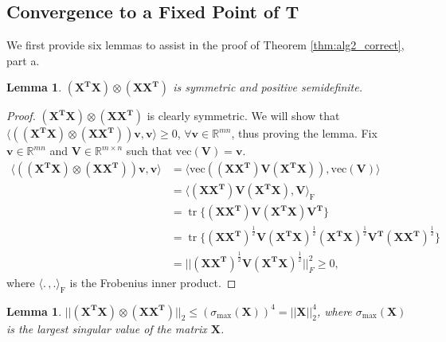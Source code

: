 \documentclass[12pt]{article}
\newtheorem{lemma}[theorem]{Lemma}
\DeclareMathOperator{\tr}{tr}
\begin{document}
\subsection{Convergence to a Fixed Point of $\mathbf{T}$} 

We first provide six lemmas to assist in the proof of Theorem \ref{thm:alg2_correct}, part a.

\begin{lemma}
\label{lemma:psd}
    $\mathbf{(X^TX) \otimes (XX^T)}$ is symmetric and positive semidefinite. 
\end{lemma}
\begin{proof}
    $\mathbf{(X^TX) \otimes (XX^T)}$ is clearly symmetric. We will show that $\langle (\mathbf{(X^TX) \otimes (XX^T)})\mathbf{v}, \mathbf{v} \rangle \geq 0$, $\forall \mathbf{v} \in \mathbb{R}^{mn}$, thus proving the lemma. Fix $\mathbf{v} \in \mathbb{R}^{mn}$ and $\mathbf{V} \in \mathbb{R}^{m \times n}$ such that $\text{vec}(\mathbf{V}) = \mathbf{v}$.
    \begin{equation*}
        \begin{split}
            \langle (\mathbf{(X^TX) \otimes (XX^T)})\mathbf{v}, \mathbf{v} \rangle & = \langle \text{vec}(\mathbf{(XX^T)V(X^TX)}), \text{vec}(\mathbf{V}) \rangle \\
            & = \langle \mathbf{(XX^T)V(X^TX)}, \mathbf{V} \rangle_{\text{F}} \\
            & = \tr\{\mathbf{(XX^T)V(X^TX)V^T}\} \\
            & = \tr\{\mathbf{(XX^T)}^{\frac{1}{2}}\mathbf{V(X^TX)}^{\frac{1}{2}}\mathbf{(X^TX)}^{\frac{1}{2}}\mathbf{V^T(XX^T)}^{\frac{1}{2}}\} \\   
            & = ||\mathbf{(XX^T)}^{\frac{1}{2}}\mathbf{V(X^TX)}^{\frac{1}{2}}||_F^2 \geq 0,
        \end{split}
    \end{equation*}
where $\langle . \, , . \rangle_{\text{F}}$ is the Frobenius inner product. 

\end{proof}

\begin{lemma}
\label{lemma:sigma_bound}
$||\mathbf{(X^TX) \otimes (XX^T)}||_2 \leq (\sigma_{\text{max}}(\mathbf{X}))^4 = ||\mathbf{X}||_2^4$, where $\sigma_{\text{max}}(\mathbf{X})$ is the largest singular value of the matrix $\mathbf{X}$.    
\end{lemma}
\end{document}
